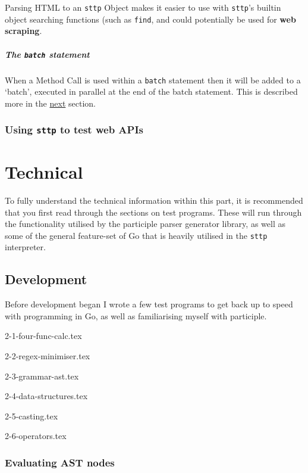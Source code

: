 \documentclass[]{full}
\theoremstyle{definition}
\begin{document}
Parsing HTML to an \verb|sttp| Object makes it easier to use with \verb|sttp|'s builtin object searching functions (such as \verb|find|, and could potentially be used for \textbf{web scraping}.

\cprotect\subsubsection{The \verb|batch| statement}

When a Method Call is used within a \verb|batch| statement then it will be added to a `batch', executed in parallel at the end of the batch statement. This is described more in the \hyperref[sec:batching]{next} section.

\cprotect\section{Using \verb|sttp| to test web APIs}
\label{sec:hello-sttp-using-sttp-to-test}

\part{Technical}

To fully understand the technical information within this part, it is recommended that you first read through the sections on test programs. These will run through the functionality utilised by the participle parser generator library, as well as some of the general feature-set of Go that is heavily utilised in the \verb|sttp| interpreter.

\chapter{Development}
\label{chap:development}

Before development began I wrote a few test programs to get back up to speed with programming in Go, as well as familiarising myself with participle.

{2-1-four-func-calc.tex}

{2-2-regex-minimiser.tex}

{2-3-grammar-ast.tex}

{2-4-data-structures.tex}

{2-5-casting.tex}

{2-6-operators.tex}

\section{Evaluating AST nodes}
\end{document}
